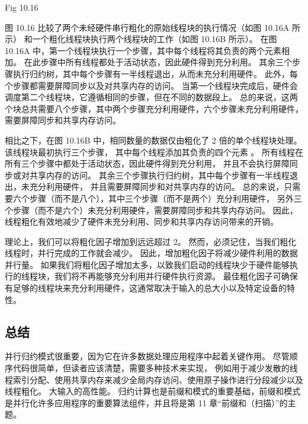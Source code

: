 {\color{red} Fig 10.16}

图 10.16 比较了两个未经硬件串行粗化的原始线程块的执行情况（如图 10.16A 所示）
和一个粗化线程块执行两个线程块的工作（如图 10.16B 所示）。 
在图 10.16A 中，第一个线程块执行一个步骤，其中每个线程将其负责的两个元素相加。 
在此步骤中所有线程都处于活动状态，因此硬件得到充分利用。 
其余三个步骤执行归约树，其中每个步骤有一半线程退出，从而未充分利用硬件。 
此外，每个步骤都需要屏障同步以及对共享内存的访问。 
当第一个线程块完成后，硬件会调度第二个线程块，它遵循相同的步骤，但在不同的数据段上。 
总的来说，这两个块总共需要八个步骤，其中两个步骤充分利用硬件，六个步骤未充分利用硬件，需要屏障同步和共享内存访问。

相比之下，在图 10.16B 中，相同数量的数据仅由粗化了 2 倍的单个线程块处理。该线程块最初执行三个步骤，
其中每个线程添加其负责的四个元素 。 所有线程在所有三个步骤中都处于活动状态，因此硬件得到充分利用，
并且不会执行屏障同步或对共享内存的访问。 其余三个步骤执行归约树，其中每个步骤有一半线程退出，未充分利用硬件，
并且需要屏障同步和对共享内存的访问。 总的来说，只需要六个步骤（而不是八个），其中三个步骤（而不是两个）充分利用硬件，
另外三个步骤（而不是六个）未充分利用硬件，需要屏障同步和共享内存访问。 
因此，线程粗化有效地减少了硬件未充分利用、同步和共享内存访问带来的开销。

理论上，我们可以将粗化因子增加到远远超过 2。 然而，必须记住，当我们粗化线程时，并行完成的工作就会减少。 
因此，增加粗化因子将减少硬件利用的数据并行量。 
如果我们将粗化因子增加太多，以致我们启动的线程块少于硬件能够执行的线程块，我们将不再能够充分利用并行硬件执行资源。 
最佳粗化因子可确保有足够的线程块来充分利用硬件，这通常取决于输入的总大小以及特定设备的特性。

\subsection{总结}
并行归约模式很重要，因为它在许多数据处理应用程序中起着关键作用。 尽管顺序代码很简单，但读者应该清楚，需要多种技术来实现，
例如用于减少发散的线程索引分配、使用共享内存来减少全局内存访问、使用原子操作进行分段减少以及线程粗化。 大输入的高性能。 
归约计算也是前缀和模式的重要基础，前缀和模式是并行化许多应用程序的重要算法组件，并且将是第 11 章“前缀和（扫描）”的主题。